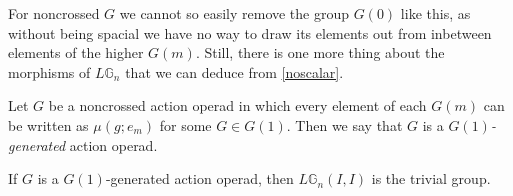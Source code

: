 For noncrossed $G$ we cannot so easily remove the group $G(0)$ like this, as without being spacial we have no way to draw its elements out from inbetween elements of the higher $G(m)$. Still, there is one more thing about the morphisms of $L\mathbb{G}_n$ that we can deduce from \cref{noscalar}.

\begin{defn} Let $G$ be a noncrossed action operad in which every element of each $G(m)$ can be written as $\mu(g;e_m)$ for some $G \in G(1)$. Then we say that $G$ is a \emph{$G(1)$-generated} action operad. \end{defn}

\begin{lem} \label{noscalarnoncross} If $G$ is a $G(1)$-generated action operad, then $L\mathbb{G}_n(I,I)$ is the trivial group.
\end{lem}
